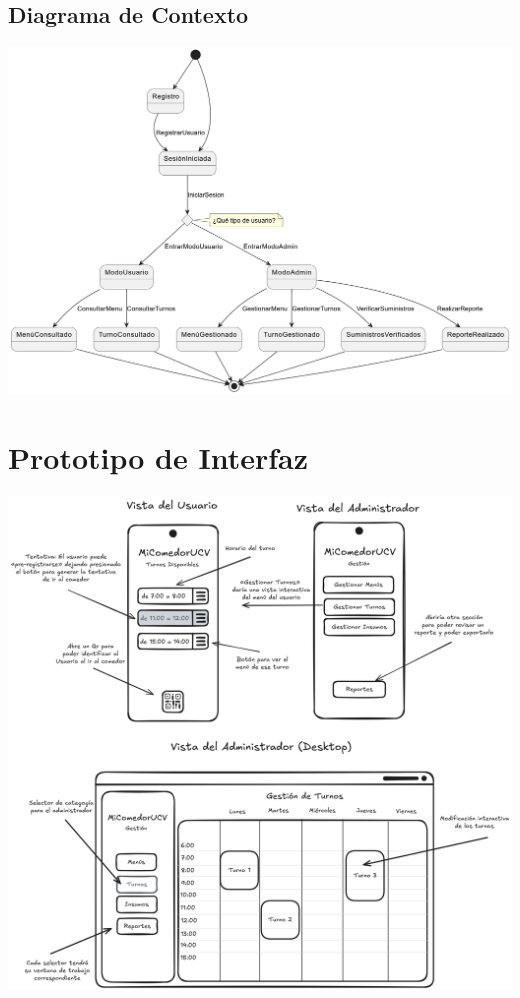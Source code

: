 \documentclass[12pt]{article}
\begin{document}
\begin{landscape}
	\section{Diagrama de Contexto}
	\vspace{1cm}
	\begin{center}
		\includegraphics[width=19cm]{Requirements Discipline - Context Diagram.png}
	\end{center}
\end{landscape}

\pagebreak

\section{Prototipo de Interfaz}
\vspace{1cm}
\begin{center}
	\includegraphics[width=17cm]{Requitements Discipline - Prototipe Wireframe.png}
\end{center}
\end{document}
